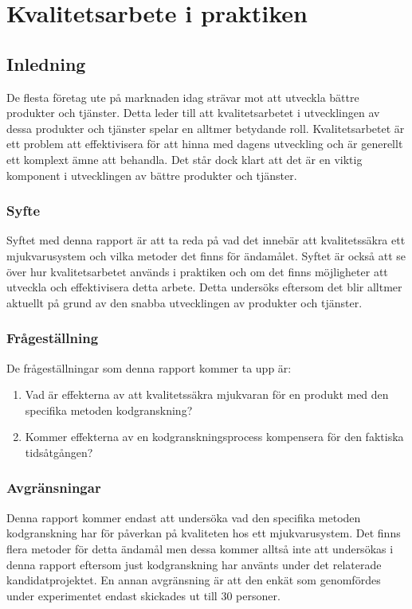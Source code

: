\chapter{Kvalitetsarbete i praktiken}
\label{cha:indiv-report-wallstrom}


\section{Inledning}
\label{sec:introduction-wallstrom}

De flesta företag ute på marknaden idag strävar mot att utveckla bättre produkter och tjänster. Detta leder till att kvalitetsarbetet i utvecklingen av dessa produkter och tjänster spelar en alltmer betydande roll. Kvalitetsarbetet är ett problem att effektivisera för att hinna med dagens utveckling och är generellt ett komplext ämne att behandla. Det står dock klart att det är en viktig komponent i utvecklingen av bättre produkter och tjänster.

\subsection{Syfte}
\label{sec:purpose-wallstrom}

Syftet med denna rapport är att ta reda på vad det innebär att kvalitetssäkra ett mjukvarusystem och vilka metoder det finns för ändamålet. Syftet är också att se över hur kvalitetsarbetet används i praktiken och om det finns möjligheter att utveckla och effektivisera detta arbete. Detta undersöks eftersom det blir alltmer aktuellt på grund av den snabba utvecklingen av produkter och tjänster.

\subsection{Frågeställning}
\label{sec:issue-wallstrom}

De frågeställningar som denna rapport kommer ta upp är:

\begin{enumerate}
	\item Vad är effekterna av att kvalitetssäkra mjukvaran för en produkt med den specifika metoden kodgranskning?
	\item Kommer effekterna av en kodgranskningsprocess kompensera för den faktiska tidsåtgången?
\end{enumerate}

\subsection{Avgränsningar}
Denna rapport kommer endast att undersöka vad den specifika metoden kodgranskning har för påverkan på kvaliteten hos ett mjukvarusystem. Det finns flera metoder för detta ändamål men dessa kommer alltså inte att undersökas i denna rapport eftersom just kodgranskning har använts under det relaterade kandidatprojektet. En annan avgränsning är att den enkät som genomfördes under experimentet endast skickades ut till 30 personer.


